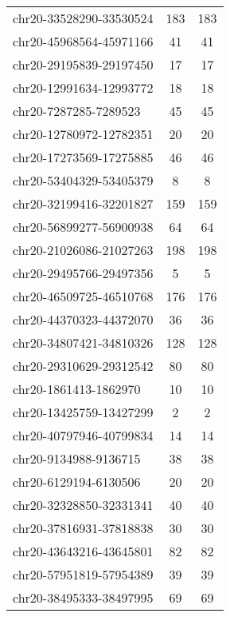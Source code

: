\documentclass[10pt,letterpaper]{article}
\begin{document}
{\begin{longtable}{lSS}
	chr20-33528290-33530524 & 183    & 183                   \\
	chr20-45968564-45971166 & 41     & 41                    \\
	chr20-29195839-29197450 & 17     & 17                    \\
	chr20-12991634-12993772 & 18     & 18                    \\
	chr20-7287285-7289523   & 45     & 45                    \\
	chr20-12780972-12782351 & 20     & 20                    \\
	chr20-17273569-17275885 & 46     & 46                    \\
	chr20-53404329-53405379 & 8      & 8                     \\
	chr20-32199416-32201827 & 159    & 159                   \\
	chr20-56899277-56900938 & 64     & 64                    \\
	chr20-21026086-21027263 & 198    & 198                   \\
	chr20-29495766-29497356 & 5      & 5                     \\
	chr20-46509725-46510768 & 176    & 176                   \\
	chr20-44370323-44372070 & 36     & 36                    \\
	chr20-34807421-34810326 & 128    & 128                   \\
	chr20-29310629-29312542 & 80     & 80                    \\
	chr20-1861413-1862970   & 10     & 10                    \\
	chr20-13425759-13427299 & 2      & 2                     \\
	chr20-40797946-40799834 & 14     & 14                    \\
	chr20-9134988-9136715   & 38     & 38                    \\
	chr20-6129194-6130506   & 20     & 20                    \\
	chr20-32328850-32331341 & 40     & 40                    \\
	chr20-37816931-37818838 & 30     & 30                    \\
	chr20-43643216-43645801 & 82     & 82                    \\
	chr20-57951819-57954389 & 39     & 39                    \\
	chr20-38495333-38497995 & 69     & 69                    \\

\end{longtable}}
\end{document}
